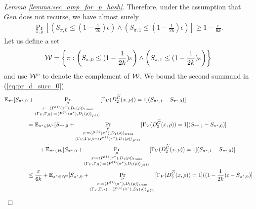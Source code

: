 \begin{proof}[Lemma \ref{lemma:sec_amp_for_p_hash}]
Therefore, under the assumption that $Gen$ does not recurse, we have almost surely
\begin{align}
\underset{\pi, \rho}{\Pr}\left[\left(S_{\pi,0} \leq (1 - \frac{1}{2k})\epsilon\right) \land \left( S_{\pi,1} \leq (1-\frac{1}{2k})\epsilon\right)\right] \geq 1 - \frac{\epsilon}{6k}.
\end{align}
Let us define a set
\begin{align}
  \mathcal{W} = \left\{ \pi :  \left(S_{\pi,0} \leq (1 - \frac{1}{2k})\varepsilon\right) \land \left( S_{\pi,1} \leq (1-\frac{1}{2k})\varepsilon \right) \right\}
\end{align}
and use $\mathcal{W}^c$ to denote the complement of $\mathcal{W}$.
We bound the second summand in (\ref{eq:pr_d_succ_0})
\begin{align}
  \label{ineq:second_eq}
&\mathbb{E}_{\pi^*}[ S_{\pi^*,0} +
\underset{
  \substack{\rho \\ x := \langle P^{(1)}(\pi^*), D_1(\rho) \rangle_{\text{trans}}
    \\ (\Gamma_V, \Gamma_H) := \langle P^{(1)}(\pi^*), D_1 (\rho) \rangle_{P^{(1)}} }}
{\Pr}[\Gamma_V(D_2^{\widetilde{C}}(x, \rho)) = 1]
(S_{\pi^*,1} - S_{\pi^*,0})] \notag\\
%
&\IndII = \mathbb{E}_{\pi^* \in \cW^c}[ S_{\pi^*,0}
+\underset{
  \substack{\rho \\ x := \langle P^{(1)}(\pi^*), D_1(\rho) \rangle_{\text{trans}}
    \\ (\Gamma_V, \Gamma_H) := \langle P^{(1)}(\pi^*), D_1 (\rho) \rangle_{P^{(1)}} }}
{\Pr}[\Gamma_V(D_2^{\widetilde{C}}(x, \rho)) = 1]
  (S_{\pi^*,1} - S_{\pi^*,0})] \notag\\
&\IndIII +  \mathbb{E}_{\pi^* \in \cW}[ S_{\pi^*,0} +
\underset{
  \substack{\rho \\ x := \langle P^{(1)}(\pi^*), D_1(\rho) \rangle_{\text{trans}}
    \\ (\Gamma_V, \Gamma_H) := \langle P^{(1)}(\pi^*), D_1 (\rho) \rangle_{P^{(1)}} }}
{\Pr}[\Gamma_V(D_2^{\widetilde{C}}(x, \rho)) = 1]
(S_{\pi^*,1} - S_{\pi^*,0}) ] \notag\\
&\IndII \leq \frac{\epsilon}{6k} + \mathbb{E}_{\pi^* \in \cW^c}[ S_{\pi^*,0} +
\underset{
  \substack{\rho \\ x := \langle P^{(1)}(\pi^*), D_1(\rho) \rangle_{\text{trans}}
    \\ (\Gamma_V, \Gamma_H) := \langle P^{(1)}(\pi^*), D_1 (\rho) \rangle_{P^{(1)}} }}
{\Pr}[\Gamma_V(D_2^{\widetilde{C}}(x, \rho)) = 1]
((1 - \frac{1}{2k})\epsilon - S_{\pi^*,0})] \notag\\

\end{align}
\end{proof}
